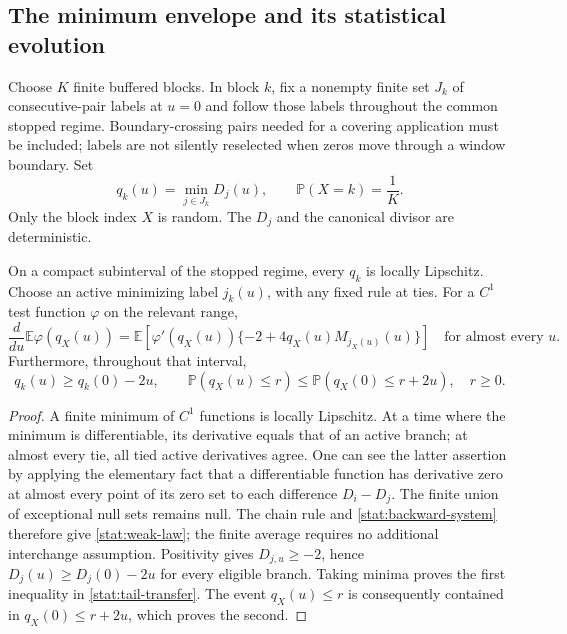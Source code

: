 \subsection{The minimum envelope and its statistical evolution}

Choose $K$ finite buffered blocks. In block $k$, fix a nonempty finite
set $J_k$ of consecutive-pair labels at $u=0$ and follow those labels
throughout the common stopped regime. Boundary-crossing pairs needed
for a covering application must be included; labels are not silently
reselected when zeros move through a window boundary. Set
\begin{equation}
 q_k(u)=\min_{j\in J_k}D_j(u),\qquad
 \mathbb P(X=k)=\frac1K.
 \label{stat:minimum-law}
\end{equation}
Only the block index $X$ is random. The $D_j$ and the canonical divisor
are deterministic.

\begin{proposition}
\label{stat:weak-evolution}
On a compact subinterval of the stopped regime, every $q_k$ is locally
Lipschitz. Choose an active minimizing label $j_k(u)$, with any fixed
rule at ties. For a $C^1$ test function $\varphi$ on the relevant range,
\begin{equation}
 \frac{d}{du}\mathbb E\varphi(q_X(u))
 =\mathbb E\!\left[
    \varphi'(q_X(u))
       \{-2+4q_X(u)M_{j_X(u)}(u)\}\right]
 \quad\text{for almost every }u.
 \label{stat:weak-law}
\end{equation}
Furthermore, throughout that interval,
\begin{equation}
 q_k(u)\ge q_k(0)-2u,
 \qquad
 \mathbb P(q_X(u)\le r)
     \le\mathbb P(q_X(0)\le r+2u),\quad r\ge0.
 \label{stat:tail-transfer}
\end{equation}
\end{proposition}

\begin{proof}
A finite minimum of $C^1$ functions is locally Lipschitz. At a time
where the minimum is differentiable, its derivative equals that of
an active branch; at almost every tie, all tied active derivatives
agree. One can see the latter assertion by applying the elementary
fact that a differentiable function has derivative zero at almost
every point of its zero set to each difference $D_i-D_j$. The finite
union of exceptional null sets remains null. The chain rule and
\eqref{stat:backward-system} therefore give \eqref{stat:weak-law};
the finite average requires no additional interchange assumption.
Positivity gives $D_{j,u}\ge-2$, hence
$D_j(u)\ge D_j(0)-2u$ for every eligible branch. Taking minima proves
the first inequality in \eqref{stat:tail-transfer}. The event
$q_X(u)\le r$ is consequently contained in
$q_X(0)\le r+2u$, which proves the second.
\end{proof}

